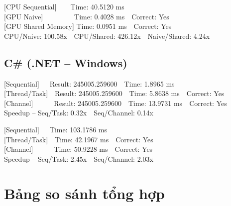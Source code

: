 \documentclass[12pt,a4paper]{article}
\begin{document}
\begin{tcolorbox}[title=Matrix Transpose (1024 $\times$ 2048),colback=black!5]
\ttfamily\small
{[CPU Sequential]}\ \ \ \ Time: 40.5120 ms\\
{[GPU Naive]}\ \ \ \ \ \ \ \ \ Time: 0.4028 ms\ \ Correct: Yes\\
{[GPU Shared Memory]} Time: 0.0951 ms\ \ Correct: Yes\\
CPU/Naive: 100.58x\ \ CPU/Shared: 426.12x\ \ Naive/Shared: 4.24x
\end{tcolorbox}

\subsection{C\# (.NET -- Windows)}

\begin{tcolorbox}[title=Dot Product (N = 1{,}000{,}000),colback=black!5]
\ttfamily\small
{[Sequential]}\ \ \ Result: 245005.259600\ \ Time: 1.8965 ms\\
{[Thread/Task]}\ \ Result: 245005.259600\ \ Time: 5.8638 ms\ \ Correct: Yes\\
{[Channel]}\ \ \ \ \ \ Result: 245005.259600\ \ Time: 13.9731 ms\ \ Correct: Yes\\
Speedup -- Seq/Task: 0.32x\ \ Seq/Channel: 0.14x
\end{tcolorbox}

\begin{tcolorbox}[title=Matrix Transpose (1024 $\times$ 2048),colback=black!5]
\ttfamily\small
{[Sequential]}\ \ \ Time: 103.1786 ms\\
{[Thread/Task]}\ \ Time: 42.1967 ms\ \ Correct: Yes\\
{[Channel]}\ \ \ \ \ \ Time: 50.9228 ms\ \ Correct: Yes\\
Speedup -- Seq/Task: 2.45x\ \ Seq/Channel: 2.03x
\end{tcolorbox}

\section{Bảng so sánh tổng hợp}
\end{document}
